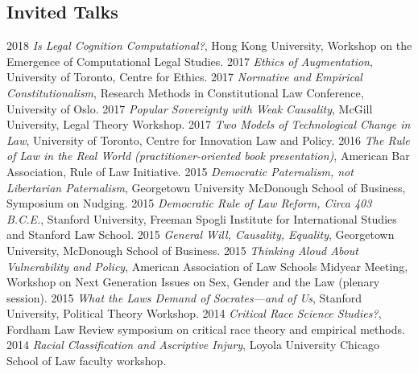 \documentclass[letterpaper]{moderncv}
\begin{document}
\subsection{Invited Talks}
\cvitem
{2018}
{\textit{Is Legal Cognition Computational?}, Hong Kong University, Workshop on the Emergence of Computational Legal Studies.}
\vspace{1mm}
\cvitem
{2017}
{\textit{Ethics of Augmentation}, University of Toronto, Centre for Ethics.}
\vspace{1mm}
\cvitem
{2017}
{\textit{Normative and Empirical Constitutionalism}, Research Methods in Constitutional Law Conference, University of Oslo.}
\vspace{1mm}
\cvitem
{2017}
{\textit{Popular Sovereignty with Weak Causality}, McGill University, Legal Theory Workshop.}
\vspace{1mm}
\cvitem
{2017}
{\textit{Two Models of Technological Change in Law}, University of Toronto, Centre for Innovation Law and Policy.}
\vspace{1mm}
\cvitem
{2016}
{\textit{The Rule of Law in the Real World (practitioner-oriented book presentation)}, American Bar Association, Rule of Law Initiative.}
\vspace{1mm}
\cvitem
{2015}
{\textit{Democratic Paternalism, not Libertarian Paternalism}, Georgetown University McDonough School of Business, Symposium on Nudging.}
\vspace{1mm}
\cvitem
{2015}
{\textit{Democratic Rule of Law Reform, Circa 403 B.C.E.}, Stanford University, Freeman Spogli Institute for International Studies and Stanford Law School.}
\vspace{1mm}
\cvitem
{2015}
{\textit{General Will, Causality, Equality}, Georgetown University, McDonough School of Business.}
\vspace{1mm}
\cvitem
{2015}
{\textit{Thinking Aloud About Vulnerability and Policy}, American Association of Law Schools Midyear Meeting, Workshop on Next Generation Issues on Sex, Gender and the Law (plenary session).}
\vspace{1mm}
\cvitem
{2015}
{\textit{What the Laws Demand of Socrates---and of Us}, Stanford University, Political Theory Workshop.}
\vspace{1mm}
\cvitem
{2014}
{\textit{Critical Race Science Studies?}, Fordham Law Review symposium on critical race theory and empirical methods.}
\vspace{1mm}
\cvitem
{2014}
{\textit{Racial Classification and Ascriptive Injury}, Loyola University Chicago School of Law faculty workshop.}
\end{document}
